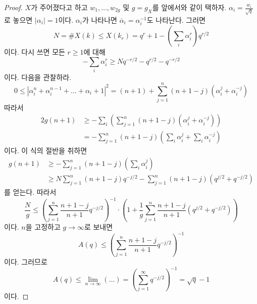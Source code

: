 \begin{proof}
$X$가 주어졌다고 하고 $w_1, \ldots, w_{2g}$ 및 $g = g_X$를
앞에서와 같이 택하자. $\alpha_i = \frac{w_i}{\sqrt{q}}$로 놓으면
$|\alpha_i| = 1$이다. $\alpha_i$가 나타나면
$\overline{\alpha}_i = \alpha_i^{-1}$도 나타난다. 그러면
$$
N = \# X(k) \leq X(k_r) = q^r + 1 - (\sum_i \alpha_i^r) q^{r/2}
$$
이다. 다시 쓰면 모든 $r \geq 1$에 대해
$$
-\sum_i \alpha_i^r \geq Nq^{-r/2} - q^{r/2} - q^{-r/2}
$$
이다. 다음을 관찰하라.
$$
0 \leq |\alpha_i^n +\alpha_i^{n-1} +\ldots +\alpha_i +1|^2
= (n + 1) + \sum_{j = 1}^n (n + 1 - j) (\alpha_i^j + \alpha_i^{-j})
$$
따라서
\begin{align*}
2g(n+1) & \geq - \sum_i \left(\sum_{j = 1}^n (n+1-j)(\alpha_i^j
+\alpha_i^{-j})\right)\\
& =-\sum_{j = 1}^n (n+1-j)\left(\sum_i\alpha_i^j
+\sum_i\alpha_i^{-j}\right)
\end{align*}
이다. 이 식의 절반을 취하면
\begin{align*}
g(n+1)& \geq - \sum_{j = 1}^n (n+1-j)(\sum_i\alpha_i^j)\\
& \geq N\sum_{j = 1}^n (n+1-j)q^{-j/2}-\sum_{j = 1}^n
(n+1-j)(q^{j/2}+q^{-j/2})
\end{align*}
를 얻는다. 따라서
$$
\frac{N}{g}\leq \left(\sum_{j = 1}^n \frac{n+1-j}{n+1}q^{-j/2} \right)^{-1}
\cdot
\left(
1 + \frac{1}{g} \sum_{j = 1}^n \frac{n + 1 - j}{n + 1}(q^{j/2} + q^{-j/2})
\right)
$$
이다. $n$을 고정하고 $g\to \infty$로 보내면
$$
A(q)\leq \left(\sum_{j = 1}^n \frac{n+1-j}{n+1}q^{-j/2}\right)^{-1}
$$
이다. 그러므로
$$
A(q)\leq \lim_{n\to\infty}(\ldots) = \left(\sum_{j = 1}^\infty
q^{-j/2}\right)^{-1}=\sqrt{q}-1
$$
이다.
\end{proof}











